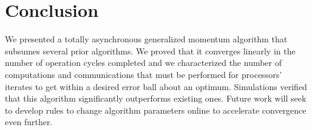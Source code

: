 \documentclass[9pt,shortpaper,twoside,web]{ieeecolor}
\begin{document}
\section{Conclusion}

We presented a totally asynchronous generalized momentum algorithm
that subsumes several prior algorithms. 
We proved that it converges linearly in the number of operation cycles completed and 
we characterized the number of computations and communications that must be performed 
for processors' iterates to get within a desired error ball about an optimum. 
Simulations verified that this algorithm significantly outperforms existing ones. 
Future work will seek to develop rules to change algorithm parameters 
online to accelerate convergence even further. 






\appendix
\end{document}

